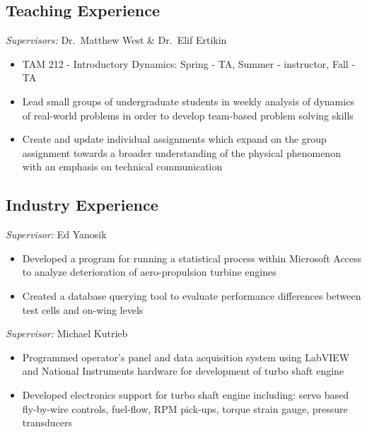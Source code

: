 \documentclass[11pt,letterpaper,sans]{moderncv}
\begin{document}
\subsection{Teaching Experience}

%
  {\textit{Supervisors:} Dr.\ Matthew West \& Dr.\ Elif Ertikin
  \begin{itemize}
	\item TAM 212 - Introductory Dynamics: Spring - TA, Summer - instructor, Fall - TA
  	\item Lead small groups of undergraduate students in weekly analysis of dynamics of real-world problems in order to develop team-based problem solving skills
	\item  Create and update individual assignments which expand on the group assignment towards a broader understanding of the physical phenomenon with an emphasis on technical communication
  \end{itemize}
  }

\subsection{Industry Experience}

%
  {\textit{Supervisor:} Ed Yanosik
  \begin{itemize}
  	\item Developed a program for running a statistical process within Microsoft Access to analyze deterioration of aero-propulsion turbine engines
	\item Created a database querying tool to evaluate performance differences between test cells and on-wing levels
  \end{itemize}
  }

%
  {\textit{Supervisor:} Michael Kutrieb
  \begin{itemize}
  	\item Programmed operator's panel and data acquisition system using LabVIEW and National Instruments hardware for development of turbo shaft engine
	\item Developed electronics support for turbo shaft engine including: servo based fly-by-wire controls, fuel-flow, RPM pick-ups, torque strain gauge, pressure transducers
  \end{itemize}
  }
\end{document}
